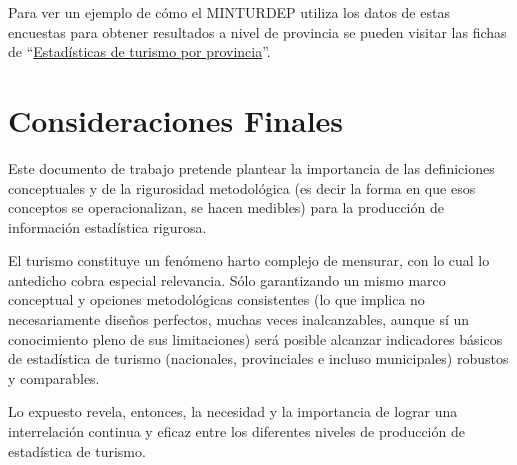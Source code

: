 \documentclass[
  openany]{book}
\begin{document}
Para ver un ejemplo de cómo el MINTURDEP utiliza los datos de estas encuestas para obtener resultados a nivel de provincia se pueden visitar las fichas de ``\href{https://www.yvera.tur.ar/estadistica/info/estadisticas-de-turismo-por-provincias}{Estadísticas de turismo por provincia}''.

\hypertarget{consideraciones-finales}{%
\chapter*{Consideraciones Finales}\label{consideraciones-finales}}

Este documento de trabajo pretende plantear la importancia de las definiciones conceptuales y de la rigurosidad metodológica (es decir la forma en que esos conceptos se operacionalizan, se hacen medibles) para la producción de información estadística rigurosa.

El turismo constituye un fenómeno harto complejo de mensurar, con lo cual lo antedicho cobra especial relevancia.
Sólo garantizando un mismo marco conceptual y opciones metodológicas consistentes (lo que implica no necesariamente diseños perfectos, muchas veces inalcanzables, aunque sí un conocimiento pleno de sus limitaciones) será posible alcanzar indicadores básicos de estadística de turismo (nacionales, provinciales e incluso municipales) robustos y comparables.

Lo expuesto revela, entonces, la necesidad y la importancia de lograr una interrelación continua y eficaz entre los diferentes niveles de producción de estadística de turismo.

  
\end{document}
